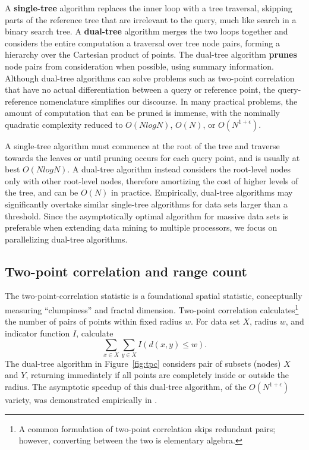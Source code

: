 \documentclass[twoside,leqno,twocolumn]{article}
\newcommand{\fig}[1]{Figure~\ref{fig:#1}}
\newcommand{\mysub}[1]{\subsection{#1} }
\newcommand{\defterm}[1]{{\bf #1}}
\begin{document}
A \defterm{single-tree} algorithm replaces the inner loop with a tree traversal, skipping parts of the reference tree that are irrelevant to the query, much like search in a binary search tree.
A \defterm{dual-tree} algorithm merges the two loops together and considers the entire computation a traversal over tree node pairs, forming a hierarchy over the Cartesian product of points.
The dual-tree algorithm \defterm{prunes} node pairs from consideration when possible, using summary information.
Although dual-tree algorithms can solve problems such as two-point correlation that have no actual differentiation between a query or reference point, the query-reference nomenclature simplifies our discourse.
In many practical problems, the amount of computation that can be pruned is immense, with the nominally quadratic complexity reduced to $O(N log N)$, $O(N)$, or $O(N^{1+\epsilon})$.

A single-tree algorithm must commence at the root of the tree and traverse towards the leaves or until pruning occurs for each query point, and is usually at best $O(N log N)$.
A dual-tree algorithm instead considers the root-level nodes only with other root-level nodes, therefore amortizing the cost of higher levels of the tree, and can be $O(N)$ in practice.
Empirically, dual-tree algorithms may significantly overtake similar single-tree algorithms for data sets larger than a threshold.
Since the asymptotically optimal algorithm for massive data sets is preferable when extending data mining to multiple processors, we focus on parallelizing dual-tree algorithms.

\mysub{Two-point correlation and range count}
The two-point-correlation statistic is a foundational spatial statistic, conceptually measuring ``clumpiness'' and fractal dimension.
Two-point correlation calculates\footnote{A common formulation of two-point correlation skips redundant pairs; however, converting between the two is elementary algebra.} the number of pairs of points within fixed radius $w$.
For data set $X$, radius $w$, and indicator function $I$, calculate
\[\sum_{x \in X} \sum_{y \in X} I(d(x, y) \leq w).\]
\noindent
The dual-tree algorithm in \fig{tpc} considers pair of subsets (nodes) $X$ and $Y$, returning immediately if all points are completely inside or outside the radius.
The asymptotic speedup of this dual-tree algorithm, of the $O(N^{1+\epsilon})$ variety, was demonstrated empirically in \cite{gray_nbody}.
\end{document}
